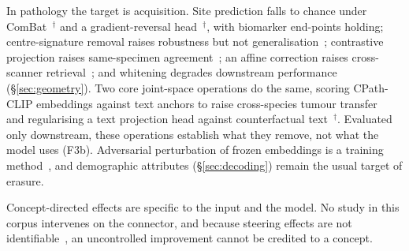 In pathology the target is acquisition. Site prediction falls to chance under
ComBat~\cite{murchan2024deep}$^{\dagger}$ and a gradient-reversal head~\cite{zhang2025hospital}$^{\dagger}$,
with biomarker end-points holding; centre-signature removal raises robustness but not
generalisation~\cite{kmen2026robust}; contrastive projection raises same-specimen
agreement~\cite{carloni2025pathology}; an affine correction raises cross-scanner
retrieval~\cite{donle2026featmap}; and whitening degrades downstream
performance~\cite{garciahidalgo2026embedding} (\S\ref{sec:geometry}). Two core joint-space operations do
the same, scoring CPath-CLIP embeddings against text anchors to raise cross-species tumour
transfer~\cite{arora2026semantic} and regularising a text projection head against counterfactual
text~\cite{balogh2026regularization}$^{\dagger}$. Evaluated only downstream, these operations establish
what they remove, not what the model uses (F3b). Adversarial perturbation of frozen embeddings is a
training method~\cite{xu2024apple}, and demographic attributes (\S\ref{sec:decoding}) remain the usual
target of erasure.

Concept-directed effects are specific to the input and the model. No study in this corpus intervenes
on the connector, and because steering effects are not
identifiable~\cite{korznikov2025the,venkatesh2026nonident}, an uncontrolled improvement cannot be
credited to a concept.
